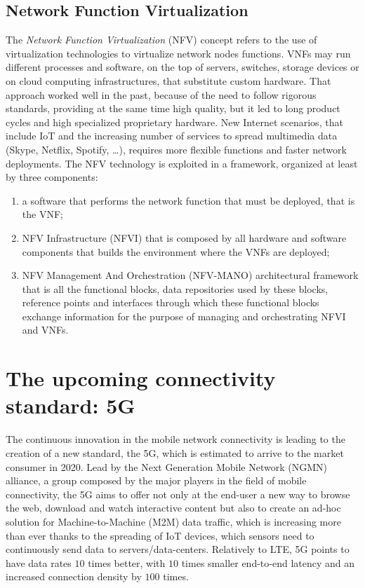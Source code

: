 \subsection{Network Function Virtualization}
The \emph{Network Function Virtualization} (NFV) concept refers to the use of 
virtualization technologies to virtualize network nodes functions. VNFs may run 
different processes and software, on the top of servers, switches, storage 
devices or on cloud computing infrastructures, that substitute custom hardware. 
That approach worked well in the past, because of the need to follow rigorous 
standards, providing at the same time high quality, but it led to long product 
cycles and high specialized proprietary hardware. New Internet scenarios, that 
include IoT and the increasing number of services to spread multimedia data 
(Skype, Netflix, Spotify, \dots), requires more flexible functions and faster 
network deployments. The NFV technology is exploited in a framework, organized
at least by three components:
\begin{enumerate}
 \item a software that performs the network function that must be deployed,
 that is the VNF;
 \item NFV Infrastructure (NFVI) that is composed by all hardware and software 
components that builds the environment where the VNFs are deployed;
 \item NFV Management And Orchestration (NFV-MANO) architectural framework that
 is all the functional blocks, data repositories used by these blocks,
 reference points and interfaces through which these functional blocks exchange
 information for the purpose of managing and orchestrating NFVI and VNFs.
\end{enumerate}

\section{The upcoming connectivity standard: 5G}
The continuous innovation in the mobile network connectivity is leading to the
creation of a new standard, the 5G, which is estimated to arrive to the market
consumer in 2020. Lead by the Next Generation Mobile Network (NGMN)
alliance, a group composed by the major players in the field of mobile
connectivity, the 5G aims to offer not only at the end-user a new way to browse 
the web, download and watch interactive content but also to create an ad-hoc 
solution for Machine-to-Machine (M2M) data traffic, which is increasing more 
than ever thanks to the spreading of IoT devices, which sensors need to 
continuously send data to servers/data-centers. Relatively to LTE, 5G points to have data rates $10$ times better, with $10$ times 
smaller end-to-end latency and an increased connection density by $100$ 
times.

